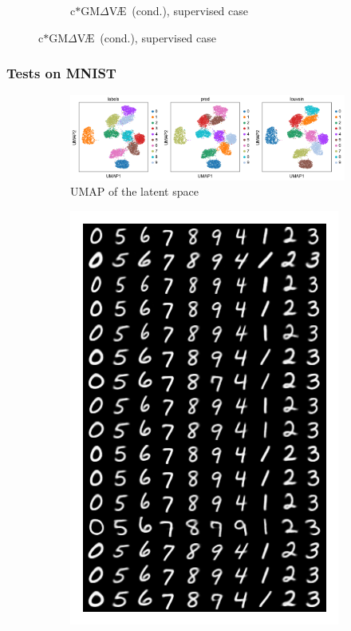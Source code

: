 \documentclass[final]{beamer}
\newcommand{\gmvae}{c$\ast$GM$\Delta$V\AE~}
\begin{document}
\begin{frame}
\begin{figure}[h]
\begin{subfigure}[b]{0.45\textwidth}
\caption{\gmvae (cond.), supervised case}
\label{fig:dirgmmcvae_super}
\end{subfigure}
\end{figure}
\end{frame}

\begin{frame}
\frametitle{Tests on MNIST}
\begin{figure}[h]
\centering
\begin{subfigure}[b]{0.80\textwidth}
\includegraphics[width=\textwidth]{images/gmmvae_mnist_us_latent_umap.png}
\caption{UMAP of the latent space}
\label{fig:mnist_us_latent}
\end{subfigure}
\begin{subfigure}[b]{0.3\textwidth}
\includegraphics[width=\textwidth]{images/gmmvae_mnist_us_samples2.png}

\end{subfigure}
\end{figure}
\end{frame}
\end{document}
